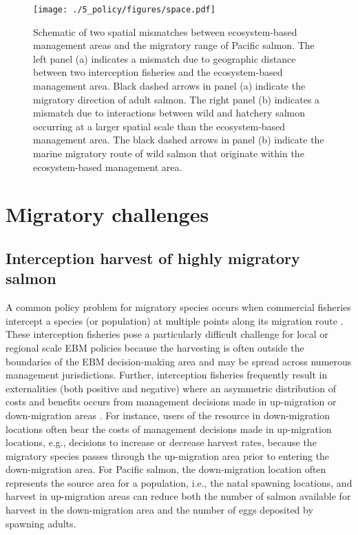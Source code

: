 \begin{figure}[htbp]
  \centering \texttt{[image: ./5\_policy/figures/space.pdf]}
  \caption[Schematic of two spatial mismatches between ecosystem-based
           management areas and the migratory range of Pacific
           salmon]{Schematic of two spatial mismatches between ecosystem-based
           management areas and the migratory range of Pacific salmon. The left
           panel (a) indicates a mismatch due to geographic distance between two
           interception fisheries and the ecosystem-based management area. Black
           dashed arrows in panel (a) indicate the migratory direction of adult
           salmon. The right panel (b) indicates a mismatch due to interactions
           between wild and hatchery salmon occurring at a larger spatial scale
           than the ecosystem-based management area. The black dashed arrows in
           panel (b) indicate the marine migratory route of wild salmon that
           originate within the ecosystem-based management area.}
  \label{fig:ebm:1}
\end{figure}



\section{Migratory challenges}

\subsection{Interception harvest of highly migratory salmon}

A common policy problem for migratory species occurs when commercial fisheries
intercept a species (or population) at multiple points along its migration route
\citep{Lascelles2014}. These interception fisheries pose a particularly
difficult challenge for local or regional scale EBM policies because the
harvesting is often outside the boundaries of the EBM decision-making area and
may be spread across numerous management jurisdictions. Further, interception
fisheries frequently result in externalities (both positive and negative) where
an asymmetric distribution of costs and benefits occurs from management
decisions made in up-migration or down-migration areas \citep{Scherer1990}. For
instance, users of the resource in down-migration locations often bear the costs
of management decisions made in up-migration locations, e.g., decisions to
increase or decrease harvest rates, because the migratory species passes through
the up-migration area prior to entering the down-migration area. For Pacific
salmon, the down-migration location often represents the source area for a
population, i.e., the natal spawning locations, and harvest in up-migration
areas can reduce both the number of salmon available for harvest in the
down-migration area and the number of eggs deposited by spawning adults.

